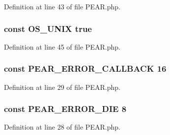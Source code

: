 Definition at line 43 of file P\-E\-A\-R.\-php.

\hypertarget{PEAR_8php_aac9eed8b1212799624da961df2b7469f}{
\subsubsection[{O\-S\-\_\-\-U\-N\-I\-X}]{\setlength{\rightskip}{0pt plus 5cm}const O\-S\-\_\-\-U\-N\-I\-X true}}\label{PEAR_8php_aac9eed8b1212799624da961df2b7469f}


Definition at line 45 of file P\-E\-A\-R.\-php.

\hypertarget{PEAR_8php_ad1780c583741d97d9a2b3077516744af}{
\subsubsection[{P\-E\-A\-R\-\_\-\-E\-R\-R\-O\-R\-\_\-\-C\-A\-L\-L\-B\-A\-C\-K}]{\setlength{\rightskip}{0pt plus 5cm}const P\-E\-A\-R\-\_\-\-E\-R\-R\-O\-R\-\_\-\-C\-A\-L\-L\-B\-A\-C\-K 16}}\label{PEAR_8php_ad1780c583741d97d9a2b3077516744af}


Definition at line 29 of file P\-E\-A\-R.\-php.

\hypertarget{PEAR_8php_ad34f61c0049eae3d64aca2ad2e6003ab}{
\subsubsection[{P\-E\-A\-R\-\_\-\-E\-R\-R\-O\-R\-\_\-\-D\-I\-E}]{\setlength{\rightskip}{0pt plus 5cm}const P\-E\-A\-R\-\_\-\-E\-R\-R\-O\-R\-\_\-\-D\-I\-E 8}}\label{PEAR_8php_ad34f61c0049eae3d64aca2ad2e6003ab}


Definition at line 28 of file P\-E\-A\-R.\-php.

